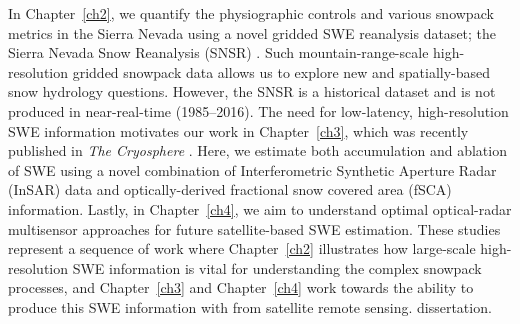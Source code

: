 In Chapter~\ref{ch2}, we quantify the physiographic controls and various snowpack metrics in the Sierra Nevada using a novel gridded SWE reanalysis dataset; the Sierra Nevada Snow Reanalysis (SNSR) \citep{margulisLandsatEraSierraNevada2016}. Such mountain-range-scale high-resolution gridded snowpack data allows us to explore new and spatially-based snow hydrology questions. However, the SNSR is a historical dataset and is not produced in near-real-time (1985--2016). The need for low-latency, high-resolution SWE information motivates our work in Chapter~\ref{ch3}, which was recently published in \emph{The Cryosphere} \citep{tarriconeEstimatingSnowAccumulation2023a}. Here, we estimate both accumulation and ablation of SWE using a novel combination of Interferometric Synthetic Aperture Radar (InSAR) data and optically-derived fractional snow covered area (fSCA) information. Lastly, in Chapter~\ref{ch4}, we aim to understand optimal optical-radar multisensor approaches for future satellite-based SWE estimation. These studies represent a sequence of work where Chapter~\ref{ch2} illustrates how large-scale high-resolution SWE information is vital for understanding the complex snowpack processes, and Chapter~\ref{ch3} and Chapter~\ref{ch4} work towards the ability to produce this SWE information with from satellite remote sensing. dissertation. 






